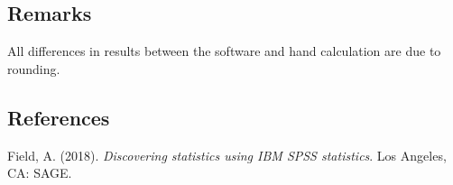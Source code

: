 \documentclass[
]{book}
\begin{document}
\hypertarget{remarks}{%
\subsection{Remarks}\label{remarks}}

All differences in results between the software and hand calculation are due to rounding.

\hypertarget{references}{%
\subsection{References}\label{references}}

Field, A. (2018). \emph{Discovering statistics using IBM SPSS statistics}. Los Angeles, CA: SAGE.

  
\end{document}
